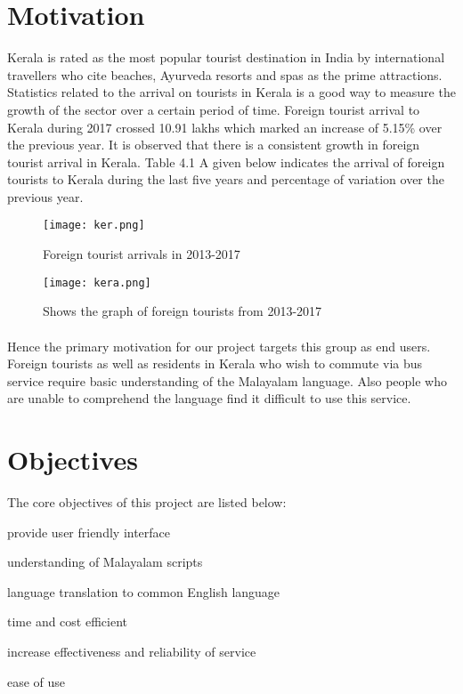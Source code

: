 \documentclass[a4paper,12pt]{report}
\begin{document}
\section{Motivation}
Kerala is rated as the most popular tourist destination in India by international travellers who cite beaches, Ayurveda resorts and spas as the prime attractions. Statistics related to the arrival on tourists in Kerala is a good way to measure the growth of the sector over a certain period of time. Foreign tourist arrival to Kerala during 2017 crossed 10.91 lakhs which marked an increase of 5.15\% over the previous year. It is observed that there is a consistent growth in foreign tourist arrival in Kerala. Table 4.1 A given below indicates the arrival of foreign tourists to Kerala during the last five years and percentage of variation over the previous year. 

\vspace*{1.5cm}
\begin{figure}[!h]
	\begin{center}
		\texttt{[image: ker.png]}    
		\caption{Foreign tourist arrivals in 2013-2017} 
		\label{fig1}
	\end{center}
\end{figure}
\vspace*{1.5cm}

\vspace*{1.5cm}
\begin{figure}[!h]
	\begin{center}
		\texttt{[image: kera.png]}    
		\caption{Shows the graph of foreign tourists from 2013-2017} 
		\label{fig1}
	\end{center}
\end{figure}
\vspace*{1.5cm}


\paragraph{}
Hence the primary motivation for our project targets this group as end users. Foreign tourists as well as residents in Kerala who wish to commute via bus service require basic understanding of the Malayalam language. Also people who are unable to comprehend the language find it difficult to use this service. 

\section{Objectives}
The core objectives of this project are listed below:
\item provide user friendly interface
\item understanding of Malayalam scripts
\item language translation to common English language
\item time and cost efficient
\item increase effectiveness and reliability of service
\item ease of use
\end{document}
